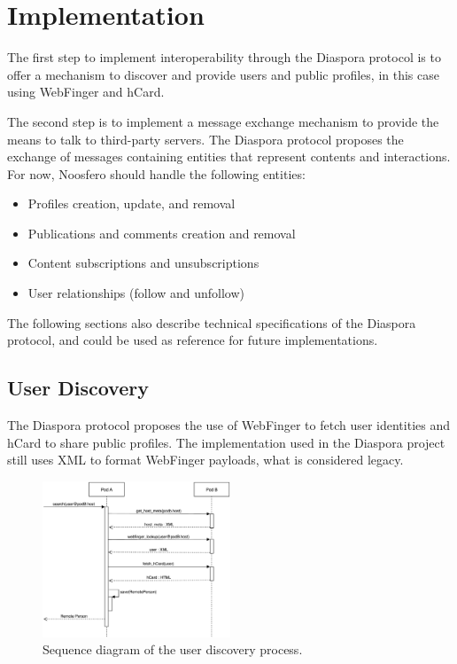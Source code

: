 \chapter{Implementation}
\label{chapter:5}

The first step to implement interoperability through the Diaspora
protocol is to offer a mechanism to discover and provide users and
public profiles, in this case using WebFinger and hCard.

The second step is to implement a message exchange mechanism to provide
the means to talk to third-party servers. The Diaspora protocol proposes
the exchange of messages containing entities that represent contents and
interactions. For now, Noosfero should handle the following entities:

\begin{itemize}
  \item Profiles creation, update, and removal
  \item Publications and comments creation and removal
  \item Content subscriptions and unsubscriptions
  \item User relationships (follow and unfollow)
\end{itemize}

The following sections also describe technical specifications of the
Diaspora protocol, and could be used as reference for future
implementations.

\section{User Discovery}

The Diaspora protocol proposes the use of WebFinger to fetch user
identities and hCard to share public profiles. The implementation used
in the Diaspora project still uses XML to format WebFinger payloads,
what is considered legacy.

\begin{figure}[h]
	\centering
		\includegraphics[width=0.5\textwidth]{figures/seq_descoberta.eps}
	\caption{Sequence diagram of the user discovery process.}
	\label{fig:seq_discovery}
\end{figure}


